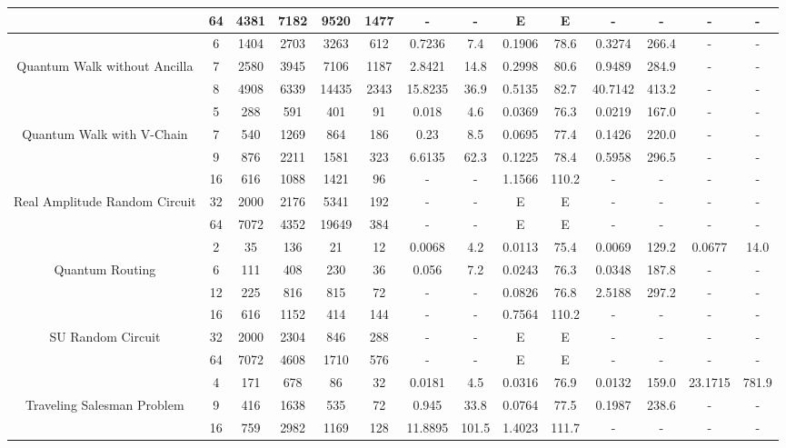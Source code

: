 \begin{table}[htb]
{\begin{tabular}{|c|c|c|c|c|c|c|c|c|c|c|c|c|c|}
 & 
64 & 4381 & 7182 & 9520 & 1477
 & - & -
 & E & E
 & - & -
 & - & -
 \\
\hline
 & 
6 & 1404 & 2703 & 3263 & 612
 & 0.7236 & 7.4
 & 0.1906 & 78.6
 & 0.3274 & 266.4
 & - & -
 \\
Quantum Walk without Ancilla & 
7 & 2580 & 3945 & 7106 & 1187
 & 2.8421 & 14.8
 & 0.2998 & 80.6
 & 0.9489 & 284.9
 & - & -
 \\
 & 
8 & 4908 & 6339 & 14435 & 2343
 & 15.8235 & 36.9
 & 0.5135 & 82.7
 & 40.7142 & 413.2
 & - & -
 \\
\hline
 & 
5 & 288 & 591 & 401 & 91
 & 0.018 & 4.6
 & 0.0369 & 76.3
 & 0.0219 & 167.0
 & - & -
 \\
Quantum Walk with V-Chain & 
7 & 540 & 1269 & 864 & 186
 & 0.23 & 8.5
 & 0.0695 & 77.4
 & 0.1426 & 220.0
 & - & -
 \\
 & 
9 & 876 & 2211 & 1581 & 323
 & 6.6135 & 62.3
 & 0.1225 & 78.4
 & 0.5958 & 296.5
 & - & -
 \\
\hline
 & 
16 & 616 & 1088 & 1421 & 96
 & - & -
 & 1.1566 & 110.2
 & - & -
 & - & -
 \\
Real Amplitude Random Circuit & 
32 & 2000 & 2176 & 5341 & 192
 & - & -
 & E & E
 & - & -
 & - & -
 \\
 & 
64 & 7072 & 4352 & 19649 & 384
 & - & -
 & E & E
 & - & -
 & - & -
 \\
\hline
 & 
2 & 35 & 136 & 21 & 12
 & 0.0068 & 4.2
 & 0.0113 & 75.4
 & 0.0069 & 129.2
 & 0.0677 & 14.0
 \\
Quantum Routing & 
6 & 111 & 408 & 230 & 36
 & 0.056 & 7.2
 & 0.0243 & 76.3
 & 0.0348 & 187.8
 & - & -
 \\
 & 
12 & 225 & 816 & 815 & 72
 & - & -
 & 0.0826 & 76.8
 & 2.5188 & 297.2
 & - & -
 \\
\hline
 & 
16 & 616 & 1152 & 414 & 144
 & - & -
 & 0.7564 & 110.2
 & - & -
 & - & -
 \\
SU Random Circuit & 
32 & 2000 & 2304 & 846 & 288
 & - & -
 & E & E
 & - & -
 & - & -
 \\
 & 
64 & 7072 & 4608 & 1710 & 576
 & - & -
 & E & E
 & - & -
 & - & -
 \\
\hline
 & 
4 & 171 & 678 & 86 & 32
 & 0.0181 & 4.5
 & 0.0316 & 76.9
 & 0.0132 & 159.0
 & 23.1715 & 781.9
 \\
Traveling Salesman Problem & 
9 & 416 & 1638 & 535 & 72
 & 0.945 & 33.8
 & 0.0764 & 77.5
 & 0.1987 & 238.6
 & - & -
 \\
 & 
16 & 759 & 2982 & 1169 & 128
 & 11.8895 & 101.5
 & 1.4023 & 111.7
 & - & -
 & - & -
 \\

\end{tabular}}
\end{table}
